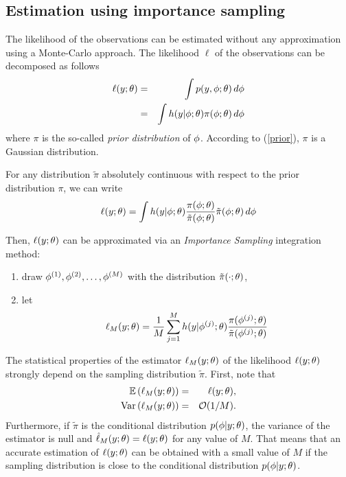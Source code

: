 \subsection{Estimation using importance sampling}

The likelihood of the observations can be estimated without any
approximation using a Monte-Carlo approach.
The likelihood $\ell$ of the observations can be decomposed as follows
\begin{eqnarray*}
 \ell(y;{\theta}) &=& \int p(y,{\phi};{\theta})\,d{\phi} \\
&=& \int h(y|{\phi};{\theta})\pi({\phi};{\theta})\,d{\phi}
\end{eqnarray*}
where $\pi$ is the so-called {\it prior distribution} of ${\phi}$. According to (\ref{prior}), $\pi$
is a Gaussian distribution.

For any distribution $\tilde{\pi}$ absolutely continuous with respect to the prior distribution
$\pi$, we can write
$$
\ell(y;{\theta}) = \int h(y|{\phi};{\theta}) \frac {\pi({\phi};{\theta})}{
\tilde{\pi}({\phi};{\theta}) }  \tilde{\pi}({\phi};{\theta}) \,d{\phi}
$$


Then, $\ell(y;{\theta})$ can be approximated via an {\it Importance Sampling} integration method:
\begin{enumerate}
\item draw ${\phi}^{(1)} ,{\phi}^{(2)} ,\ldots,{\phi}^{(M)} $ with the distribution $\tilde{\pi}(\cdot;{\theta})$,
\item let
\begin{equation} \label{islike}
 \ell_M(y;{\theta}) =\frac{1}{M} \sum_{j=1}^{M} h(y|{\phi}^{(j)};{\theta} )\frac{\pi( {\phi}^{(j)} ;{\theta})}{ \tilde{\pi}({\phi}^{(j)} ;{\theta}) }
\end{equation}
\end{enumerate}

The statistical properties of the estimator $\ell_M(y;{\theta})$ of the likelihood
$\ell(y;{\theta})$ strongly depend on the sampling distribution  $\tilde{\pi}$. First, note that
\begin{eqnarray*}
\mathbb{E}\left({\ell}_M(y;{\theta})\right) &=& \ell(y;{\theta}), \\
\mbox{Var}\left({\ell}_M(y;{\theta})\right) &=& {\cal O}(1/M).
\end{eqnarray*}
Furthermore, if $\tilde{\pi}$ is the conditional distribution
$p(\phi|y;{\theta})$, the variance of the estimator is null and
$\hat{\ell}_M(y;{\theta}) = \ell(y;{\theta})$ for any value of
$M$. That means that an accurate estimation of $\ell(y;{\theta})$
can be obtained with a small value of $M$ if the sampling
distribution is close to the conditional distribution
$p(\phi|y;{\theta})$.


